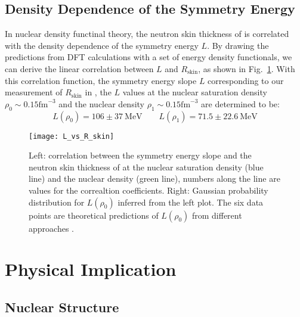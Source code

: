 \subsection{Density Dependence of the Symmetry Energy}
In nuclear density functinal theory, the neutron skin thickness of \Pb is 
correlated with the density dependence of the symmetry energy $L$. 
By drawing the predictions from DFT calculations with a set of energy density 
functionals, we can derive the linear correlation between $L$ and $R_{\text{skin}}$,
as shown in Fig.~\ref{fig:L_vs_R_skin}. With this correlation function, the
symmetry energy slope $L$ corresponding to our measurement of 
$R_{\text{skin}}$ in \Pb, the $L$ values at the nuclear saturation density 
$\rho_0 \sim 0.15 \mathrm{fm}^{-3}$ and the nuclear density $\rho_1 \sim 0.15 \mathrm{fm}^{-3}$ 
are determined to be:
\begin{equation}
    L(\rho_0) = 106 \pm 37 \ \mathrm{MeV}	\qquad L(\rho_1) = 71.5 \pm 22.6 \ \mathrm{MeV}
\end{equation}
\begin{figure}[!h]
    \centering
    \texttt{[image: L\_vs\_R\_skin]}
    \caption[Correlation plot between L and Rskin]
    {Left: correlation between the symmetry energy slope 
    and the neutron skin thickness of \Pb at the nuclear saturation density (blue line)
    and the nuclear density (green line), numbers along the line are values
    for the correaltion coefficients. Right: Gaussian probability distribution
    for $L(\rho_0)$ inferred from the left plot. The six data points are theoretical
    predictions of $L(\rho_0)$ from different approaches \cite{PhysRevLett.126.172503}.
    }
    \label{fig:L_vs_R_skin}
\end{figure}
\section{Physical Implication}

\subsection{Nuclear Structure}
\begin{comment}
    QCD ==> EFT ==> Interactions ==> ab-initio ==> shell model ==> DFT
\end{comment}

